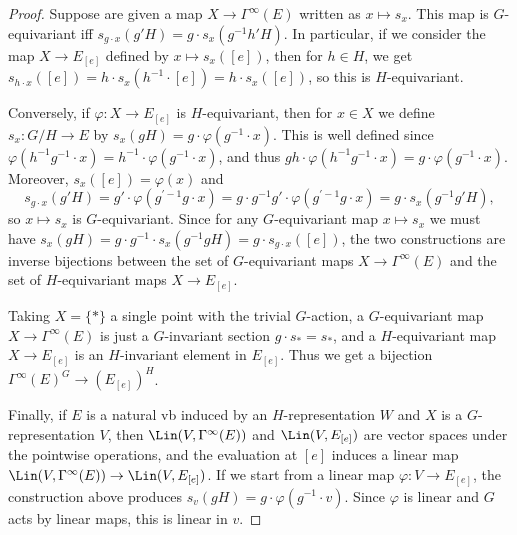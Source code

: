 \begin{proof}
    Suppose are given a map $X\to\Gamma^\infty(E)$ written as $x\mapsto  s_x$. This map is $G$-equivariant iff $ s_{g\cdot x}(g'H)=g\cdot s_x(g^{-1}h'H)$. In particular, if we consider the map $X\to E_{[e]}$ defined by $x\mapsto  s_x([e])$, then for $h\in H$, we get $ s_{h\cdot x}([e])=h\cdot  s_x(h^{-1}\cdot[e])=h\cdot s_x([e])$, so this is $H$-equivariant. 
    
    Conversely, if $\varphi:X\to E_{[e]}$ is $H$-equivariant, then for $x\in X$ we define $ s_x:G\slash H\to E$ by $ s_x(gH)=g\cdot \varphi(g^{-1}\cdot x)$. This is well defined since $\varphi(h^{-1}g^{-1}\cdot x)=h^{-1}\cdot \varphi(g^{-1}\cdot x)$, and thus $gh\cdot \varphi(h^{-1}g^{-1}\cdot x)=g\cdot \varphi(g^{-1}\cdot x)$. Moreover, $ s_x([e])=\varphi(x)$ and 
    \[ s_{g\cdot x}(g'H)=g'\cdot \varphi(g^{\prime-1}g\cdot x)=g\cdot g^{-1}g'\cdot \varphi(g^{\prime-1}g\cdot x)=g\cdot s_x(g^{-1}g'H),\]
    so $x\mapsto  s_x$ is $G$-equivariant. Since for any $G$-equivariant map $x\mapsto  s_x$ we must have $ s_x(gH)=g\cdot g^{-1}\cdot  s_x(g^{-1}gH)=g\cdot  s_{g\cdot x}([e])$, the two constructions are inverse bijections between the set of $G$-equivariant maps $X\to \Gamma^\infty(E)$ and the set of $H$-equivariant maps $X\to E_{[e]}$.

    Taking $X=\{*\}$ a single point with the trivial $G$-action, a $G$-equivariant map $X\to \Gamma^\infty(E)$ is just a $G$-invariant section $g\cdot  s_*= s_*$, and a $H$-equivariant map $X\to E_{[e]}$ is an $H$-invariant element in $E_{[e]}$. Thus we get a bijection $\Gamma^\infty(E)^G\to (E_{[e]})^H$.

    Finally, if $E$ is a natural \gls{vb} induced by an $H$-representation $W$ and $X$ is a $G$-representation $V$, then $\Lin(V,\Gamma^\infty(E))$ and $\Lin(V,E_{[e]})$ are vector spaces under the pointwise operations, and the evaluation at $[e]$ induces a linear map $\Lin(V,\Gamma^\infty(E))\to \Lin(V,E_{[e]})$. If we start from a linear map $\varphi:V\to E_{[e]}$, the construction above produces $ s_v(gH)=g\cdot \varphi(g^{-1}\cdot v)$. Since $\varphi$ is linear and $G$ acts by linear maps, this is linear in $v$.
\end{proof}

